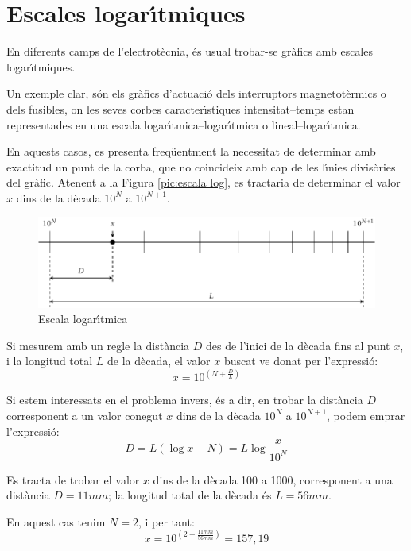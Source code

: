 \section{Escales logar\'{\i}tmiques} 

En diferents camps de l'electrot\`{e}cnia, \'{e}s usual trobar-se gr\`{a}fics amb escales
logar\'{\i}tmiques.

Un exemple clar, s\'{o}n els gr\`{a}fics d'actuaci\'{o} dels interruptors magnetot\`{e}rmics o dels
fusibles, on les seves corbes caracter\'{\i}stiques intensitat--temps estan representades en
una escala logar\'{\i}tmica--logar\'{\i}tmica o lineal--logar\'{\i}tmica.

En aquests casos, es presenta freq\"{u}entment la necessitat de determinar amb exactitud un
punt de la corba, que no coincideix amb cap de les l\'{\i}nies divis\`{o}ries del gr\`{a}fic. Atenent a
la Figura \vref{pic:escala log}, es tractaria de determinar el valor $x$ dins de la d\`{e}cada
$10^N$ a $10^{N+1}$.

\begin{figure}[htb]
\vspace{5mm} \centering
    \includegraphics{Imatges/Ape-EscalesLog.pdf}
\caption{Escala logar\'{\i}tmica} \label{pic:escala log}
\end{figure}

Si mesurem amb un regle la dist\`{a}ncia $D$ des de l'inici de la d\`{e}cada fins al punt $x$, i
la longitud total $L$ de la d\`{e}cada, el valor $x$ buscat ve donat per l'expressi\'{o}:
\begin{equation}
    x = 10^{\left(N+\frac{D}{L}\right)}
\end{equation}

Si estem interessats en el problema invers, \'{e}s a dir, en  trobar la dist\`{a}ncia $D$
corresponent a un valor conegut $x$ dins de la d\`{e}cada $10^N$ a $10^{N+1}$, podem emprar
l'expressi\'{o}:
\begin{equation}
    D = L(\log x - N) = L \log\frac{x}{10^N}
\end{equation}

\begin{exemple}
Es tracta de trobar el valor $x$ dins de la d\`{e}cada 100 a 1000, corresponent a una
dist\`{a}ncia $D=11\unit{mm}$; la longitud total de la d\`{e}cada \'{e}s $L=56\unit{mm}$.

En aquest cas tenim $N=2$, i per tant:
\[
    x = 10^{\left(2+\frac{11\unit{mm}}{56\unit{mm}}\right)}= 157{,}19
\]
\end{exemple}

